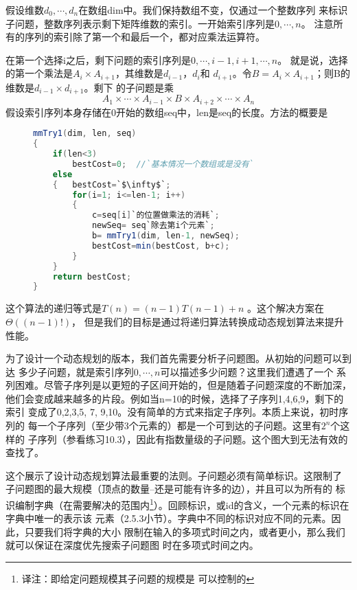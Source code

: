 假设维数$d_0, \cdots, d_n$在数组dim中。我们保持数组不变，仅通过一个整数序列
来标识子问题，整数序列表示剩下矩阵维数的索引。一开始索引序列是$0, \cdots, n$。
注意所有的序列的索引除了第一个和最后一个，都对应乘法运算符。

在第一个选择i之后，剩下问题的索引序列是$0, \cdots, i-1, i+1, \cdots, n$。
就是说，选择的第一个乘法是$A_i\times A_{i+1}$，其维数是$d_{i-1}$，$d_i$和
$d_{i+1}$。令$B=A_i \times A_{i+1}$；则B的维数是$d_{i-1}\times d_{i+1}$。剩下
的子问题是乘
\begin{displaymath}
A_1\times \cdots \times A_{i-1} \times B \times  A_{i+2} \times \cdots \times A_n
\end{displaymath}
假设索引序列本身存储在0开始的数组seq中，len是seq的长度。方法的概要是
\begin{figure}
\begin{lstlisting}[language={Java},keywordstyle=\color{blue!70}, commentstyle=\color{red!50!green!50!blue!50}]
mmTry1(dim, len, seq)
{
    if(len<3)
        bestCost=0;  //`基本情况一个数组或是没有`
    else
    {   bestCost=`$\infty$`;
        for(i=1; i<=len-1; i++)
        {
            c=seq[i]`的位置做乘法的消耗`;
            newSeq= seq`除去第i个元素`;
            b= mmTry1(dim, len-1, newSeq);
            bestCost=min(bestCost, b+c);
        }
    }
    return bestCost;
}
\end{lstlisting}
\end{figure}

这个算法的递归等式是$T(n)=(n-1)T(n-1)+n$ 。这个解决方案在$\Theta((n-1)!)$，
但是我们的目标是通过将递归算法转换成动态规划算法来提升性能。

为了设计一个动态规划的版本，我们首先需要分析子问题图。从初始的问题可以到达
多少子问题，就是索引序列$0, \cdots,n$可以描述多少问题？这里我们遭遇了一个
系列困难。尽管子序列是以更短的子区间开始的，但是随着子问题深度的不断加深，
他们会变成越来越多的片段。例如当n=10的时候，选择了子序列1,4,6,9，剩下的索引
变成了0,2,3,5, 7, 9,10。没有简单的方式来指定子序列。本质上来说，初时序列的
每一个子序列（至少带3个元素的）都是一个可到达的子问题。这里有$2^n$个这样的
子序列（参看练习10.3），因此有指数量级的子问题。这个图大到无法有效的查找了。

这个展示了设计动态规划算法最重要的法则。子问题必须有简单标识。这限制了
子问题图的最大规模（顶点的数量--还是可能有许多的边），并且可以为所有的
标识编制字典（在需要解决的范围内\footnote{译注：即给定问题规模其子问题的规模是
可以控制的}）。回顾标识，或id的含义，一个元素的标识在字典中唯一的表示该
元素（2.5.3小节）。字典中不同的标识对应不同的元素。因此，只要我们将字典的大小
限制在输入的多项式时间之内，或者更小，那么我们就可以保证在深度优先搜索子问题图
时在多项式时间之内。

